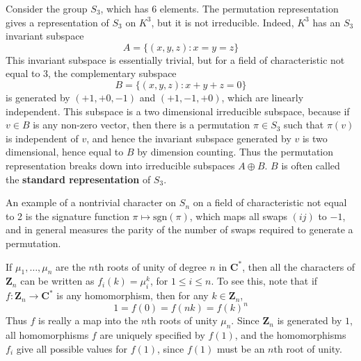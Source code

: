 \begin{example}
    Consider the group $S_3$, which has 6 elements. The permutation representation gives a representation of $S_3$ on $K^3$, but it is not irreducible. Indeed, $K^3$ has an $S_3$ invariant subspace
    \[ A = \{ (x,y,z): x = y = z \} \]
    This invariant subspace is essentially trivial, but for a field of characteristic not equal to 3, the complementary subspace
    \[ B = \{ (x,y,z) : x + y + z = 0 \} \]
    is generated by $(+1,+0,-1)$ and $(+1,-1,+0)$, which are linearly independent. This subspace is a two dimensional irreducible subspace, because if $v \in B$ is any non-zero vector, then there is a permutation $\pi \in S_3$ such that $\pi(v)$ is independent of $v$, and hence the invariant subspace generated by $v$ is two dimensional, hence equal to $B$ by dimension counting. Thus the permutation representation breaks down into irreducible subspaces $A \oplus B$. $B$ is often called the {\bf standard representation} of $S_3$.
\end{example}

\begin{example}
    An example of a nontrivial character on $S_n$ on a field of characteristic not equal to 2 is the signature function $\pi \mapsto \text{sgn}(\pi)$, which maps all swaps $(i j)$ to $-1$, and in general measures the parity of the number of swaps required to generate a permutation.
\end{example}

\begin{example}
    If $\mu_1, \dots, \mu_n$ are the $n$th roots of unity of degree $n$ in $\mathbf{C}^*$, then all the characters of $\mathbf{Z}_n$ can be written as $f_i(k) = \mu_i^k$, for $1 \leq i \leq n$. To see this, note that if $f: \mathbf{Z}_n \to \mathbf{C}^*$ is any homomorphism, then for any $k \in \mathbf{Z}_n$,
    \[ 1 = f(0) = f(nk) = f(k)^n \]
    Thus $f$ is really a map into the $n$th roots of unity $\mu_n$. Since $\mathbf{Z}_n$ is generated by $1$, all homomorphisms $f$ are uniquely specified by $f(1)$, and the homomorphisms $f_i$ give all possible values for $f(1)$, since $f(1)$ must be an $n$th root of unity.
\end{example}

